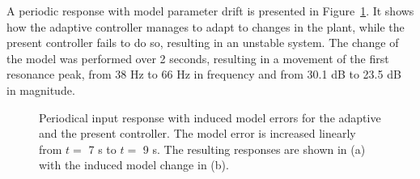 A periodic response with model parameter drift is presented in Figure~\ref{fig:modeldrift}. It shows how the adaptive controller manages to adapt to changes in the plant, while the present controller fails to do so, resulting in an unstable system. The change of the model was performed over 2 seconds, resulting in a movement of the first resonance peak, from 38 Hz to 66 Hz in frequency and from 30.1 dB to 23.5 dB in magnitude.
\begin{figure}[h!]
  \centering %
  \qquad
  \caption{\label{fig:modeldrift} Periodical input response with induced model errors for the adaptive and the present controller. The model error is increased linearly from $t=$ 7 s to $t=$ 9 s. The resulting responses are shown in (a) with the induced model change in (b).}
\end{figure}

